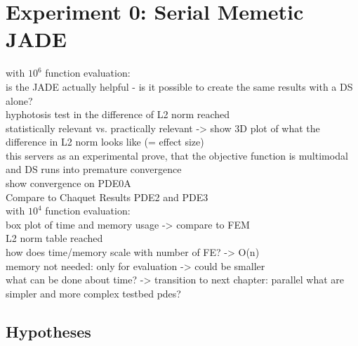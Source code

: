 \documentclass[./\jobname.tex]{subfiles}
\begin{document}
\chapter {Experiment 0: Serial Memetic JADE}
\label{chap:experimet_0}

with $10^6$ function evaluation: \\
is the JADE actually helpful - is it possible to create the same results with a DS alone? \\
hyphotosis test in the difference of L2 norm reached \\
statistically relevant vs. practically relevant -> show 3D plot of what the difference in L2 norm looks like (= effect size) \\
this servers as an experimental prove, that the objective function is multimodal and DS runs into premature convergence \\

show convergence on PDE0A \\
Compare to Chaquet Results PDE2 and PDE3\\

with $10^4$ function evaluation: \\
box plot of time and memory usage -> compare to FEM \\
L2 norm table reached \\
how does time/memory scale with number of FE? -> O(n)\\
memory not needed: only for evaluation -> could be smaller \\
what can be done about time? -> transition to next chapter: parallel
what are simpler and more complex testbed pdes? \\

\section{Hypotheses}

\begin{algorithm}[H]
	\SetAlgoNoLine
	\DontPrintSemicolon
	\label{algo: memeticJADE}
\end{algorithm}
\end{document}
